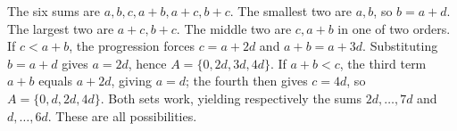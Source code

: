 The six sums are $a,b,c,a+b,a+c,b+c$. The smallest two are $a,b$, so $b=a+d$. The largest two are $a+c,b+c$. The middle two are $c,a+b$ in one of two orders. If $c<a+b$, the progression forces $c=a+2d$ and $a+b=a+3d$. Substituting $b=a+d$ gives $a=2d$, hence $A=\{0,2d,3d,4d\}$. If $a+b<c$, the third term $a+b$ equals $a+2d$, giving $a=d$; the fourth then gives $c=4d$, so $A=\{0,d,2d,4d\}$. Both sets work, yielding respectively the sums $2d,\ldots,7d$ and $d,\ldots,6d$. These are all possibilities.
